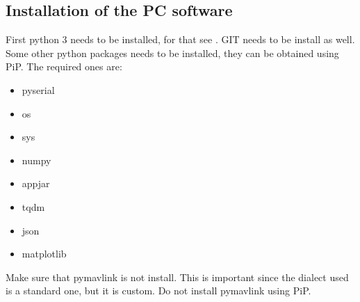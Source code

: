 \documentclass[12pt,a4paper]{article}
\begin{document}
\subsection{Installation of the PC software}
First python 3 needs to be installed, for that see \cite{py}. GIT needs to be install as well. Some other python packages needs to be installed, they can be obtained using PiP. The required ones are:\\
\begin{multicols}{3}[]
\begin{itemize}
	\item pyserial
	\item os
	\item sys
	\item numpy
	\item appjar
	\item tqdm
	\item json
	\item matplotlib
\end{itemize}
\end{multicols}

Make sure that pymavlink is not install. This is important since the dialect used is a standard one, but it is custom. Do not install pymavlink using PiP.\\
\end{document}
